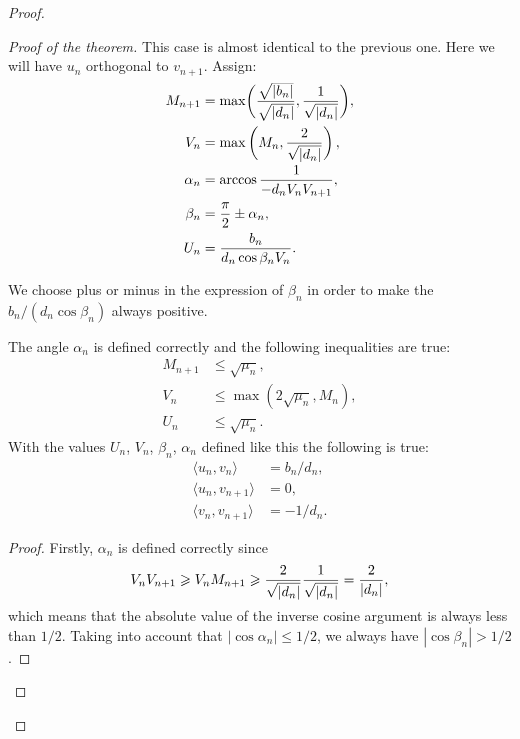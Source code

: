 \begin{proof}
\begin{proof}[Proof of the theorem]
          This case is almost identical to the previous one.
          Here we will have $u_n$ orthogonal to $v_{n+1}$.
          Assign:
          \begin{align*}
            M_{n+1} &= \max\biggl(\smash[t]{\frac{\sqrt{|b_n|}}{\sqrt{|d_n|}}}, \frac{1}{\sqrt{\smash[b]{|d_n|}}}\biggr),\\
            V_n &= \max\left(M_n, \frac{2}{\sqrt{\smash[b]{|d_n|}}}\right),\\
            \alpha_n &= \arccos{\frac{1}{-d_n V_n V_{n+1}}},\\
            \beta_n &= \frac{\pi}{2} \pm \alpha_n,\\
            U_n &= \frac{b_n}{d_n \cos{\beta_n} V_n}.
          \end{align*}
          \begin{remark*}
            We choose plus or minus in the expression of $\beta_n$ in order to make the $b_n/(d_n \cos{\beta_n})$ always positive.
          \end{remark*}
          \begin{prop}
              The angle $\alpha_n$ is defined correctly and the following inequalities are true:
              \begin{align*}
                M_{n+1} &\leq \sqrt{\mu_n},\\
                V_n &\leq \max(2\sqrt{\mu_n}, M_n),\\
                U_n &\leq \sqrt{\mu_n}.
              \end{align*}
              With the values $U_n$, $V_n$, $\beta_n$, $\alpha_n$ defined like this the following is true:
              \begin{equation}
                \label{eqn:case3}
                \begin{aligned}
                  \langle u_n, v_n \rangle &= b_n/d_n,\\
                  \langle u_n, v_{n+1} \rangle &= 0,\\
                  \langle v_n, v_{n+1} \rangle &= -1/d_n.
                \end{aligned}
              \end{equation}
          \end{prop}
          \begin{proof}
            Firstly, $\alpha_n$ is defined correctly since
            \[
              V_n V_{n+1} \geq V_n M_{n+1} \geq \frac{2}{\sqrt{\smash[b]{|d_n|}}} \frac{1}{\sqrt{\smash[b]{|d_n|}}} = \frac{2}{|d_n|},
            \]
              which means that the absolute value of the inverse cosine argument is always less than $1/2$.
            Taking into account that $|\cos{\alpha_n}| \leq 1/2$, we always have $|\cos{\beta_n}| > 1/2$.


\end{proof}
\end{proof}
\end{proof}
